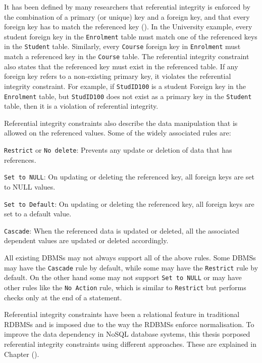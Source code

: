 It has been defined by many researchers that referential integrity is enforced
by the combination of a primary (or unique) key and a foreign key, and that
every foreign key has to match the referenced key (). In the
University example, every student foreign key in the \texttt{Enrolment} table
must match one of the referenced keys in the \texttt{Student} table. Similarly, every \texttt{Course} foreign
key in \texttt{Enrolment} must match a referenced key in the \texttt{Course} table. The
referential integrity constraint also states that the referenced key must exist
in the referenced table. If any foreign key refers to a non-existing primary
key, it violates the referential integrity constraint.  For example, if
\texttt{StudID100} is a student Foreign key in the \texttt{Enrolment} table, but
\texttt{StudID100} does not exist as a primary key in the \texttt{Student}
table, then it is a violation of referential integrity.

 
Referential integrity constraints also describe the data manipulation that is
allowed on the referenced values. Some of the widely associated rules are:

\texttt{Restrict} or \texttt{No delete}: Prevents any update or deletion of data
that has references.

\texttt{Set to NULL}: On updating or deleting the referenced key, all foreign
keys are set to NULL values.

\texttt{Set to Default}: On updating or deleting the referenced key, all foreign
keys are set to a default value.

\texttt{Cascade}: When the referenced data is updated or deleted, all the
associated dependent values are updated or deleted accordingly.

All existing \acp{DBMS} may not always support all of the above rules. Some \acp{DBMS} may
have the \texttt{Cascade} rule by default, while some may have the
\texttt{Restrict} rule by default. On the other hand some may not support
\texttt{Set to NULL} or may have other rules like the \texttt{No Action} rule,
which is similar to \texttt{Restrict} but performs checks only at the end of a
statement.

Referential integrity constraints have been a relational feature in traditional
\acp{RDBMS} and is imposed due to the way the \acp{RDBMS} enforce normalisation.
To improve the data dependency in \ac{NoSQL} database systems, this
thesis porposed referential integrity constraints using different
approaches. These are explained in Chapter ().

